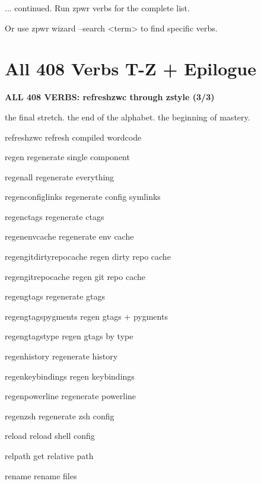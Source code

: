\documentclass[11pt,a4paper,twoside]{book}
\begin{document}
... continued. Run zpwr verbs for the complete list.

Or use zpwr wizard --search <term> to find specific verbs.


\vspace{16pt}

\section{All 408 Verbs T-Z + Epilogue}


\vspace{10pt}
{\large\bfseries\color{neoncyan} ALL 408 VERBS: refreshzwc through zstyle (3/3)}\vspace{6pt}

the final stretch. the end of the alphabet. the beginning of mastery.

refreshzwc                 refresh compiled wordcode

regen                      regenerate single component

regenall                   regenerate everything

regenconfiglinks           regenerate config symlinks

regenctags                 regenerate ctags

regenenvcache              regenerate env cache

regengitdirtyrepocache     regen dirty repo cache

\begin{codebox}
regengitrepocache          regen git repo cache\\
\end{codebox}

regengtags                 regenerate gtags

regengtagspygments         regen gtags + pygments

regengtagstype             regen gtags by type

regenhistory               regenerate history

regenkeybindings           regen keybindings

regenpowerline             regenerate powerline

regenzsh                   regenerate zsh config

reload                     reload shell config

relpath                    get relative path

rename                     rename files
\end{document}
